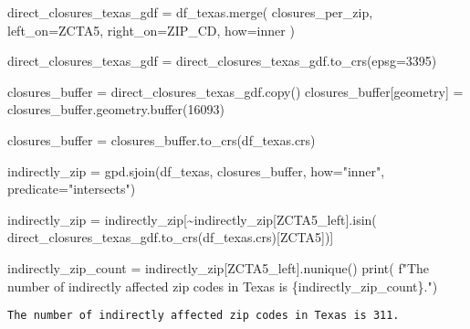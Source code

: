 \documentclass[
  letterpaper,
  DIV=11,
  numbers=noendperiod]{scrartcl}
\newenvironment{Shaded}{\begin{snugshade}}{\end{snugshade}}
\newcommand{\BuiltInTok}[1]{\textcolor[rgb]{0.00,0.23,0.31}{#1}}
\newcommand{\DecValTok}[1]{\textcolor[rgb]{0.68,0.00,0.00}{#1}}
\newcommand{\NormalTok}[1]{\textcolor[rgb]{0.00,0.23,0.31}{#1}}
\newcommand{\OperatorTok}[1]{\textcolor[rgb]{0.37,0.37,0.37}{#1}}
\newcommand{\SpecialCharTok}[1]{\textcolor[rgb]{0.37,0.37,0.37}{#1}}
\newcommand{\SpecialStringTok}[1]{\textcolor[rgb]{0.13,0.47,0.30}{#1}}
\newcommand{\StringTok}[1]{\textcolor[rgb]{0.13,0.47,0.30}{#1}}
\begin{document}
\begin{Shaded}
\begin{Highlighting}[]
\NormalTok{direct\_closures\_texas\_gdf }\OperatorTok{=}\NormalTok{ df\_texas.merge(}
\NormalTok{    closures\_per\_zip, left\_on}\OperatorTok{=}\StringTok{\textquotesingle{}ZCTA5\textquotesingle{}}\NormalTok{, right\_on}\OperatorTok{=}\StringTok{\textquotesingle{}ZIP\_CD\textquotesingle{}}\NormalTok{, how}\OperatorTok{=}\StringTok{\textquotesingle{}inner\textquotesingle{}}
\NormalTok{)}

\NormalTok{direct\_closures\_texas\_gdf }\OperatorTok{=}\NormalTok{ direct\_closures\_texas\_gdf.to\_crs(epsg}\OperatorTok{=}\DecValTok{3395}\NormalTok{)}

\NormalTok{closures\_buffer }\OperatorTok{=}\NormalTok{ direct\_closures\_texas\_gdf.copy()}
\NormalTok{closures\_buffer[}\StringTok{\textquotesingle{}geometry\textquotesingle{}}\NormalTok{] }\OperatorTok{=}\NormalTok{ closures\_buffer.geometry.}\BuiltInTok{buffer}\NormalTok{(}\DecValTok{16093}\NormalTok{)}

\NormalTok{closures\_buffer }\OperatorTok{=}\NormalTok{ closures\_buffer.to\_crs(df\_texas.crs)}

\NormalTok{indirectly\_zip }\OperatorTok{=}\NormalTok{ gpd.sjoin(df\_texas, closures\_buffer,}
\NormalTok{                           how}\OperatorTok{=}\StringTok{"inner"}\NormalTok{, predicate}\OperatorTok{=}\StringTok{"intersects"}\NormalTok{)}

\NormalTok{indirectly\_zip }\OperatorTok{=}\NormalTok{ indirectly\_zip[}\OperatorTok{\textasciitilde{}}\NormalTok{indirectly\_zip[}\StringTok{\textquotesingle{}ZCTA5\_left\textquotesingle{}}\NormalTok{].isin(}
\NormalTok{    direct\_closures\_texas\_gdf.to\_crs(df\_texas.crs)[}\StringTok{\textquotesingle{}ZCTA5\textquotesingle{}}\NormalTok{])]}

\NormalTok{indirectly\_zip\_count }\OperatorTok{=}\NormalTok{ indirectly\_zip[}\StringTok{\textquotesingle{}ZCTA5\_left\textquotesingle{}}\NormalTok{].nunique()}
\BuiltInTok{print}\NormalTok{(}
    \SpecialStringTok{f"The number of indirectly affected zip codes in Texas is }\SpecialCharTok{\{}\NormalTok{indirectly\_zip\_count}\SpecialCharTok{\}}\SpecialStringTok{."}\NormalTok{)}
\end{Highlighting}
\end{Shaded}

\begin{verbatim}
The number of indirectly affected zip codes in Texas is 311.
\end{verbatim}
\end{document}
